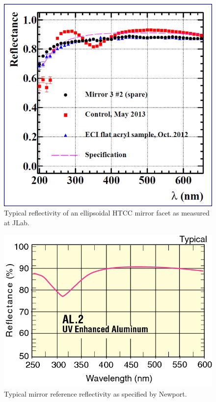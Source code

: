 \begin{figure}[ht]
    \centering
    \includegraphics[width=1.0\linewidth]{images/JLab_Mirror_Better.png}
    \caption{Typical reflectivity of an ellipsoidal HTCC mirror facet as measured at JLab.}
    \label{fig:JLab_Mirror_Better}
\end{figure}


\begin{figure}[ht]
    \centering
    \includegraphics[width=1.0\linewidth]{images/Ref_Mirror}
    \caption{Typical mirror reference reflectivity  as specified by Newport.}
    \label{fig:Ref_Mirror}
\end{figure}
 
